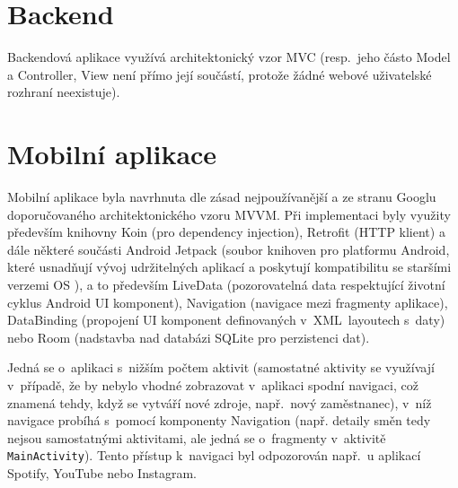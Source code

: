 \documentclass[twoside]{ctuthesis}
\begin{document}
\section{Backend}

Backendová aplikace využívá architektonický vzor MVC (resp.~jeho částo Model a Controller, View není přímo její součástí, protože žádné webové uživatelské rozhraní neexistuje).

\section{Mobilní aplikace}

Mobilní aplikace byla navrhnuta dle zásad nejpoužívanější a ze stranu Googlu doporučovaného architektonického vzoru MVVM. Při implementaci byly využity především knihovny Koin (pro dependency injection), Retrofit (HTTP klient) a dále některé součásti Android Jetpack (soubor knihoven pro platformu Android, které usnadňují vývoj udržitelných aplikací a poskytují kompatibilitu se staršími verzemi OS \cite{android2020jetpack}), a to především LiveData (pozorovatelná data respektující životní cyklus Android UI komponent), Navigation (navigace mezi fragmenty aplikace), DataBinding (propojení UI komponent definovaných v~XML~layoutech s~daty) nebo Room (nadstavba nad databázi SQLite pro perzistenci dat).

Jedná se o~aplikaci s~nižším počtem aktivit (samostatné aktivity se využívají v~případě, že by nebylo vhodné zobrazovat v~aplikaci spodní navigaci, což znamená tehdy, když se vytváří nové zdroje, např.~nový zaměstnanec), v~níž navigace probíhá s~pomocí komponenty Navigation (např. detaily směn tedy nejsou sa\-mos\-tat\-ný\-mi aktivitami, ale jedná se o~fragmenty v~aktivitě \texttt{MainActivity}). Tento přístup k~navigaci byl odpozorován např.~u aplikací Spotify, YouTube nebo Instagram.
\end{document}
